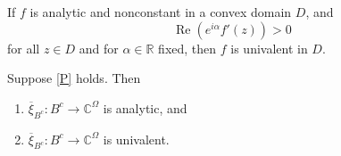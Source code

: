 \documentclass[reqno]{amsart}
\begin{document}
\begin{theorem}
If $f$ is analytic and nonconstant in a convex domain $D$, and
$$
\operatorname{Re}(e^{i \alpha} f'(z))>0
$$
for all $z \in D$ and for $\alpha \in \mathbb{R}$ fixed, then $f$ is univalent in $D$.
\end{theorem}

\begin{theorem}
\label{thm:analytic}
Suppose \eqref{P} holds. Then
\begin{enumerate}
 \item $\overline{\xi}_{B^c}:B^c \to \mathbb{C}^{\Omega}$ is analytic, and
 \item $\overline{\xi}_{B^c}:B^c \to \mathbb{C}^{\Omega}$ is univalent.
\end{enumerate}
\end{theorem}
\end{document}
